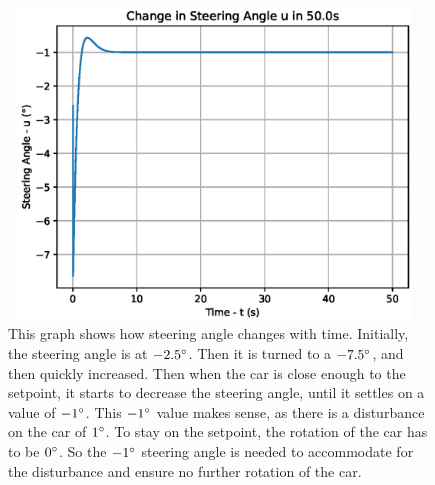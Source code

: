 \documentclass[10pt]{article}
\begin{document}
\begin{figure}[H]
\centering
\includegraphics[width=11cm, height=8.25cm]{q2_3i_u_t.eps}
\caption
{This graph shows how steering angle changes with time. Initially, the steering angle is at $-2.5\degree$. Then it is turned to a $-7.5\degree$, and then quickly increased. Then when the car is close enough to the setpoint, it starts to decrease the steering angle, until it settles on a value of $-1\degree$. This $-1\degree$ value makes sense, as there is a disturbance on the car of $1\degree$. To stay on the setpoint, the rotation of the car has to be $0\degree$. So the $-1\degree$ steering angle is needed to accommodate for the disturbance and ensure no further rotation of the car.}
\end{figure}
\end{document}
